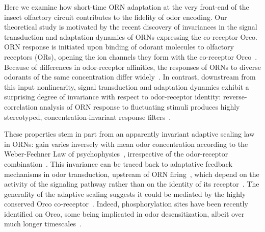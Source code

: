 \documentclass[9pt,lineno]{elife}
\begin{document}
Here we examine how short-time ORN adaptation at the very front-end of the insect olfactory circuit contributes to the fidelity of odor encoding. Our theoretical study is motivated by the recent discovery of invariances in the signal transduction and adaptation dynamics of ORNs expressing the co-receptor Orco. %
ORN response is initiated upon binding of odorant molecules to olfactory receptors (ORs), opening the ion channels they form with the co-receptor Orco~\citep{Orco, orco_structure}. Because of differences in odor-receptor affinities, the responses of ORNs to diverse odorants of the same concentration differ widely~\citep{hallem_carlson,montague2011similar,geosmin}. In contrast, downstream from this input nonlinearity, signal transduction and adaptation dynamics exhibit a surprising degree of invariance with respect to odor-receptor identity: reverse-correlation analysis of ORN response to fluctuating stimuli produces highly stereotyped, concentration-invariant response filters~\citep{martelli,si2017invariances, srinivas_elife}.

These properties stem in part from an apparently invariant adaptive scaling law in ORNs: gain varies inversely with mean odor concentration according to the Weber-Fechner Law of psychophysics~\citep{weber1996eh,fechner2012elemente}, irrespective of the odor-receptor combination~\citep{srinivas_elife,cafaro_WL,cao_WL}. This invariance can be traced back to adaptative feedback mechanisms in odor transduction, upstream of ORN firing~\citep{nagel_wilson_biophysical,cao_WL,cafaro_WL,srinivas_elife}, which depend on the activity of the signaling pathway rather than on the identity of its receptor~\citep{nagel_wilson_biophysical}. 
The generality of the adaptive scaling suggests it could be mediated by the highly conserved Orco co-receptor~\citep{orco_structure,getahun2013insect,getahun2016intracellular,Guo_Smith}. Indeed, phosphorylation sites have been recently identified on Orco, some being implicated in odor desensitization, albeit over much longer timescales~\citep{Guo_Smith_review,Guo_Smith}. 
\end{document}
